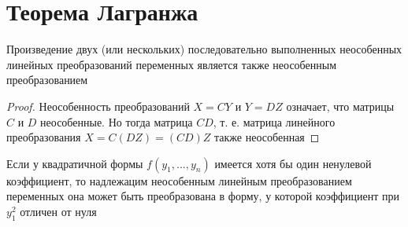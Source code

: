 \section{Теорема Лагранжа}

\begin{lemma}\label{le:1}
	Произведение двух (или нескольких) последовательно выполненных неособенных линейных преобразований переменных является также неособенным преобразованием
\end{lemma}

\begin{proof}
	Неособенность преобразований $ X = CY $ и $ Y = DZ $ означает, что матрицы $ C $ и $ D $ неособенные. Но тогда матрица $ CD $, т. е. матрица линейного преобразования $ X = C(DZ) = (CD)Z $ также неособенная
\end{proof}

\begin{lemma}\label{le:2}
	Если у квадратичной формы $ f(y_1, ..., y_n) $ имеется хотя бы один ненулевой коэффициент, то надлежацим неособенным линейным преобразованием переменных она может быть преобразована в форму, у которой коэффициент при $ y_1^2 $ отличен от нуля
\end{lemma}

